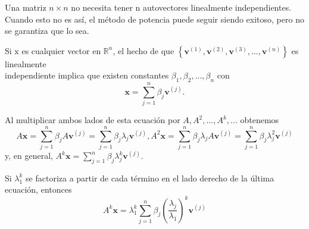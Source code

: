 \documentclass{report}
\numberwithin{subsection}{section} %
\begin{document}
Una matriz $n\times n$ no necesita tener n autovectores linealmente independientes. Cuando esto no es así, el método de potencia puede seguir siendo exitoso, pero no se garantiza que lo sea.

Si $\text{x}$ es cualquier vector en $\mathbb{R}^{n}$, el hecho de que $\left\{ \textbf{v}^{\left( 1 \right)}, \textbf{v}^{\left( 2 \right)}, \textbf{v}^{\left( 3 \right)}, ..., \textbf{v}^{\left( n \right)} \right\}$ es linealmente \\independiente implica que existen constantes $\beta_{1}, \beta_{2}, ..., \beta_{n}$ con
\begin{equation*}
\textbf{x} = \sum_{j=1}^{n} \beta_{j} \textbf{v}^{\left( j \right)}.
\end{equation*}

Al multiplicar ambos lados de esta ecuación por $A, A^{2}, ..., A^{k}, ...$ obtenemos
\begin{equation*}
A \textbf{x} = \sum_{j=1}^{n} \beta_{j} A \textbf{v}^{\left( j \right)} = \sum_{j=1}^{n} \beta_{j} \lambda_{j} \textbf{v}^{\left( j \right)}, A^{2} \textbf{x} = \sum_{j=1}^{n} \beta_{j} \lambda_{j} A \textbf{v}^{\left( j \right)} = \sum_{j=1}^{n} \beta_{j} \lambda_{j}^{2} \textbf{v}^{\left( j \right)}
\end{equation*}
y, en general, $A^{k} \textbf{x} = \sum_{j=1}^{n} \beta_{j} \lambda_{j}^{k} \textbf{v}^{\left( j \right)}$.

Si $\lambda_{1}^{k}$ se factoriza a partir de cada término en el lado derecho de la última ecuación, entonces
\begin{equation*}
A^{k} \textbf{x} = \lambda_{1}^{k} \sum_{j=1}^{n} \beta_{j} \left( \frac{\lambda_{j}}{\lambda_{1}} \right)^{k} \textbf{v}^{\left( j \right)}
\end{equation*}
\end{document}
